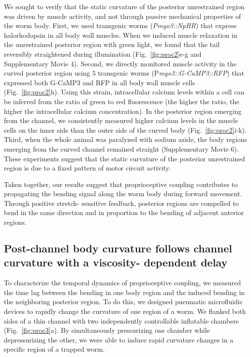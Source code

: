 We sought to verify that the static curvature of the posterior unrestrained region was driven by 
muscle activity, and not through passive mechanical properties of the worm body. First, we used 
transgenic worms (\textit{Pmyo3::NpHR}) that express halorhodopsin \citep{han_multiple-color_2007} in all body wall muscles. 
When we induced muscle relaxation in the unrestrained posterior region with green light, we 
found that the tail reversibly straightened during illumination (Fig.~\ref{fig:proc2}e-g and Supplementary 
Movie 4). Second, we directly monitored muscle activity in the curved posterior region using 
 $5$
transgenic worms (P\textit{myo3::G-CaMP3::RFP}) that expressed both G-CaMP3 and RFP in all body 
wall muscle cells (Fig.~\ref{fig:proc2}h). Using this strain, intracellular calcium levels within a cell can be 
inferred from the ratio of green to red fluorescence (the higher the ratio, the higher the 
intracellular calcium concentration). In the posterior region emerging from the channel, we 
consistently measured higher calcium levels in the muscle cells on the inner side than the outer 
side of the curved body (Fig.~\ref{fig:proc2}i-k). Third, when the whole animal was paralyzed with sodium 
azide, the body regions emerging from the curved channel remained straight (Supplementary 
Movie 6). These experiments suggest that the static curvature of the posterior unrestrained region 
is due to a fixed pattern of motor circuit activity. 


Taken together, our results suggest that proprioceptive coupling contributes to propagating the 
bending signal along the worm body during forward movement. Through positive stretch- 
sensitive feedback, posterior regions are compelled to bend in the same direction and in 
proportion to the bending of adjacent anterior regions. 
 
\subsection{Post-channel body curvature follows channel curvature with a viscosity- 
dependent delay}
 
To characterize the temporal dynamics of proprioceptive coupling, we measured the time lag 
between the bending in one body region and the induced bending in the neighboring posterior 
region. To do this, we designed pneumatic microfluidic devices to rapidly change the curvature 
of one region of a worm. We flanked both sides of a thin channel with two independently 
controllable inflatable chambers (Fig.~\ref{fig:proc3}a). By simultaneously pressurizing one chamber while 
depressurizing the other, we were able to induce rapid curvature changes in a specific region of a 
trapped worm. 

